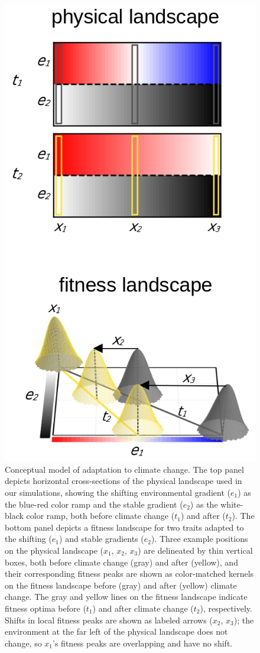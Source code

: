 \documentclass[9pt,twocolumn,twoside,lineno]{pnas-new}
\begin{document}
\begin{figure}%
\centering
\includegraphics[width=.8\linewidth]{pub/figs_and_stats/FIG_1_conceptual.jpg}
    \caption{Conceptual model of adaptation to climate change. The top panel depicts horizontal cross-sections of the physical landscape used in our simulations, showing the shifting environmental gradient ($e_{1}$) as the blue-red color ramp and the stable gradient ($e_{2}$) as the white-black color ramp, both before climate change ($t_{1}$) and after ($t_{2}$). The bottom panel depicts a fitness landscape for two traits adapted to the shifting ($e_{1}$) and stable gradients ($e_{2}$). Three example positions on the physical landscape ($x_{1}$, $x_{2}$, $x_{3}$) are delineated by thin vertical boxes, both before climate change (gray) and after (yellow), and their corresponding fitness peaks are shown as color-matched kernels on the fitness landscape before (gray) and after (yellow) climate change. The gray and yellow lines on the fitness landscape indicate fitness optima before ($t_{1}$) and after climate change ($t_{2}$), respectively. Shifts in local fitness peaks are shown as labeled arrows ($x_{2}$, $x_{3}$); the environment at the far left of the physical landscape does not change, so $x_{1}$'s fitness peaks are overlapping and have no shift.}
\label{fig:fig_1}
\end{figure}
\end{document}
